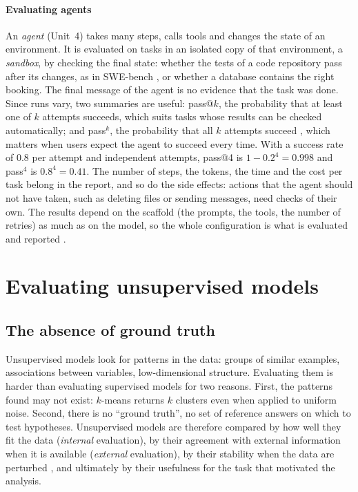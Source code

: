 \paragraph{Evaluating agents} An \emph{agent} (Unit~4) takes many steps, calls tools and
changes the state of an environment. It is evaluated on tasks in an isolated copy of that
environment, a \emph{sandbox}, by checking the final state: whether the tests of a code repository
pass after its changes, as in SWE-bench \citep{jimenez2024swebench}, or whether a database contains
the right booking. The final message of the agent is no evidence that the task was done. Since
runs vary, two summaries are useful: pass@$k$, the probability that at least one of $k$ attempts
succeeds, which suits tasks whose results can be checked automatically; and pass$^k$, the
probability that all $k$ attempts succeed \citep{yao2024taubench}, which matters when users expect
the agent to succeed every time. With a success rate of 0.8 per attempt and independent attempts,
pass@4 is $1-0.2^4=0.998$ and pass$^4$ is $0.8^4=0.41$. The number of steps, the tokens, the time
and the cost per task belong in the report, and so do the side effects: actions that the agent
should not have taken, such as deleting files or sending messages, need checks of their own. The
results depend on the scaffold (the prompts, the tools, the number of retries) as much as on the
model, so the whole configuration is what is evaluated and reported \citep{kapoor2025agents}.

\section{Evaluating unsupervised models\extsec}\label{sec:unsupervised}

\subsection{The absence of ground truth}

Unsupervised models look for patterns in the data: groups of similar examples, associations
between variables, low-dimensional structure. Evaluating them is harder than evaluating
supervised models for two reasons. First, the patterns found may not exist: $k$-means
returns $k$ clusters even when applied to uniform noise. Second, there is no ``ground truth'',
no set of reference answers on which to test hypotheses. Unsupervised models are therefore
compared by how well they fit the data (\emph{internal} evaluation), by their agreement with
external information when it is available (\emph{external} evaluation), by their stability
when the data are perturbed \citep{vonluxburg2010clustering}, and ultimately by their usefulness
for the task that motivated the analysis.

